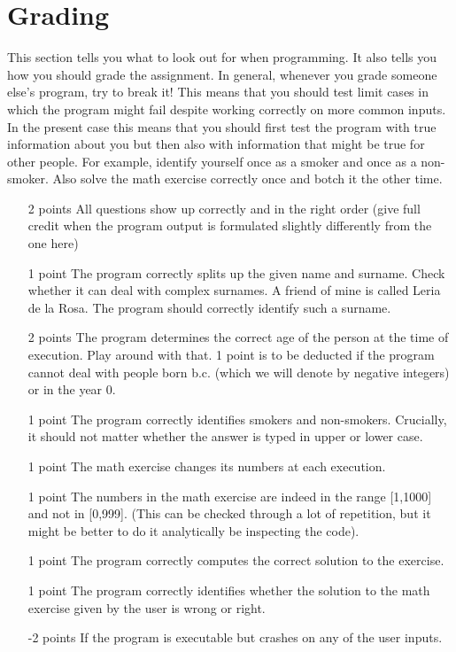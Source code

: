 \documentclass[11pt, leqno, a4paper]{article}
\begin{document}
\section{Grading}
This section tells you what to look out for when programming. It also tells you how you should grade the assignment. In general, whenever you grade 
someone else's program, try to break it! This means that you should test limit cases in which the program might fail despite working correctly
on more common inputs. In the present case this means that you should first test the program with true information about you but then also with
information that might be true for other people. For example, identify yourself once as a smoker and once as a non-smoker. Also solve the
math exercise correctly once and botch it the other time.

\enlargethispage{1cm}

\begin{itemize}
\item[2 points] All questions show up correctly and in the right order (give full credit when the program output is formulated slightly differently from the one here)
\item[1 point] The program correctly splits up the given name and surname. Check whether it can deal with complex surnames. A friend of mine is called
Leria de la Rosa. The program should correctly identify such a surname.
\item[2 points] The program determines the correct age of the person at the time of execution. Play around with that. 1 point is to be deducted if the
program cannot deal with people born b.c. (which we will denote by negative integers) or in the year 0.
\item[1 point] The program correctly identifies smokers and non-smokers. Crucially, it should not matter whether the answer is typed in upper or lower case.
\item[1 point] The math exercise changes its numbers at each execution.
\item[1 point] The numbers in the math exercise are indeed in the range [1,1000] and not in [0,999]. (This can be checked through a lot of repetition, but 
it might be better to do it analytically be inspecting the code). 
\item[1 point] The program correctly computes the correct solution to the exercise.
\item[1 point] The program correctly identifies whether the solution to the math exercise given by the user is wrong or right.
\item[-2 points] If the program is executable but crashes on any of the user inputs.
\end{itemize}
\end{document}
